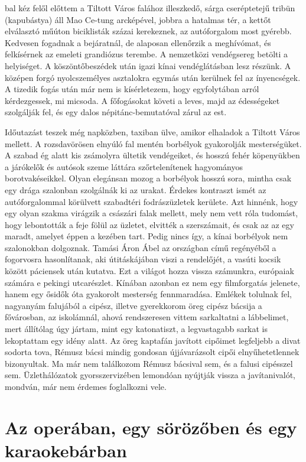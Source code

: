 bal kéz felől előttem a Tiltott Város falához illeszkedő, sárga cseréptetejű
tribün (kapubástya) áll Mao Ce-tung arcképével, jobbra a hatalmas tér,
a kettőt elválasztó műúton biciklisták százai kerekeznek, az
autóforgalom most gyérebb. Kedvesen fogadnak a bejáratnál, de alaposan
ellenőrzik a meghívómat, és felkísérnek az emeleti grandiózus
terembe. A nemzetközi vendégsereg betölti a helyiséget. A köszöntőbeszédek
után igazi kínai vendéglátásban lesz részünk. A középen forgó
nyolcszemélyes asztalokra egymás után kerülnek fel az ínyencségek.
A tizedik fogás után már nem is kísérletezem, hogy egyfolytában arról
kérdezgessek, mi micsoda. A főfogásokat követi a leves, majd az édességeket
szolgálják fel, és egy dalos népitánc-bemutatóval zárul az est.

Időutazást teszek még napközben, taxiban ülve, amikor elhaladok
a Tiltott Város mellett. A rozsdavörösen elnyúló fal mentén borbélyok
gyakorolják mesterségüket. A szabad ég alatt kis zsámolyra ültetik
vendégeiket, és hosszú fehér köpenyükben a járókelők és autósok szeme
láttára szőrtelenítenek hagyományos borotvakéseikkel. Olyan elegánsan
mozog a borbélyok hosszú sora, mintha csak egy drága szalonban szolgálnák
ki az urakat. Érdekes kontraszt ismét az autóforgalommal körülvett
szabadtéri fodrászüzletek kerülete. Azt hinnénk, hogy egy olyan szakma
virágzik a császári falak mellett, mely nem vett róla tudomást, hogy
lebontották a feje fölül az üzletet, elvitték a szerszámait, és csak az az egy
maradt, amelyet éppen a kezében tart. Pedig nincs így, a kínai borbélyok
nem szalonokban dolgoznak. Tamási Áron Ábel az országban című regényéből
a fogorvosra hasonlítanak, aki útitáskájában viszi a rendelőjét,
a vasúti kocsik között páciensek után kutatva. Ezt a világot hozza vissza
számunkra, európaiak számára e pekingi utcarészlet. Kínában azonban
ez nem egy filmforgatás jelenete, hanem egy ősidők óta gyakorolt mesterség
fennmaradása. Emlékek tolulnak fel, nagyanyám falujából a cipész, illetve
gyerekkorom öreg cipész bácsija a fővárosban, az iskolámnál, ahová
rendszeresen vittem sarkaltatni a lábbelimet, mert állítólag úgy jártam,
mint egy katonatiszt, a legvastagabb sarkat is lekoptattam egy idény alatt.
Az öreg kaptafán javított cipőimet legfeljebb a divat sodorta tova, Rémusz
bácsi mindig gondosan újjávarázsolt cipői elnyűhetetlennek bizonyultak.
Ma már nem találkozom Rémusz bácsival sem, és a falusi cipésszel sem.
Üzlethálózatok gyorsszervizében lemondóan nyújtják vissza a javítanivalót,
mondván, már nem érdemes foglalkozni vele.

\section{Az operában, egy sörözőben és egy karaokebárban}

